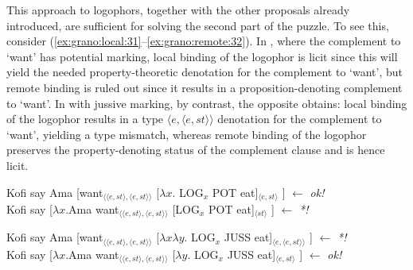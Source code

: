 \documentclass[output=paper,modfonts,nonflat]{langsci/langscibook}
\begin{document}
This approach to logophors, together with the other proposals already introduced, are sufficient for solving the second part of the puzzle. To see this, consider (\ref{ex:grano:local:31}--\ref{ex:grano:remote:32}). In , where the complement to `want' has potential marking, local binding of the logophor is licit since this will yield the needed property-theoretic denotation for the complement to `want', but remote binding is ruled out since it results in a proposition-denoting complement to `want'. In  with jussive marking, by contrast, the opposite obtains: local binding of the logophor results in a type $\langle e,\langle e,st\rangle\rangle$ denotation for the complement to `want', yielding a type mismatch, whereas remote binding of the logophor preserves the property-denoting status of the complement clause and is hence licit. 


\ea  \label{ex:grano:local:31}
    \begin{xlist}
    \ex Kofi  say Ama [want$_{\langle\langle e,st\rangle,\langle e,st\rangle\rangle}$ [$\lambda x$. LOG$_{x}$ POT eat]$_{\langle e,st\rangle}$ ] \hfill $\leftarrow$ \emph{ok!}\\
    \ex Kofi  say [$\lambda x$.Ama want$_{\langle\langle e,st\rangle,\langle e,st\rangle\rangle}$ [LOG$_{x}$ POT eat]$_{\langle st\rangle}$ ] \hfill $\leftarrow$ \emph{*!} 
    \end{xlist}
\z

\ea  \label{ex:grano:remote:32}
    \begin{xlist}
    \ex Kofi  say Ama [want$_{\langle\langle e,st\rangle,\langle e,st\rangle\rangle}$ [$\lambda x\lambda y$. LOG$_{x}$ JUSS eat]$_{\langle e,\langle e,st\rangle\rangle}$ ] \hfill $\leftarrow$ \emph{*!}\\
    \ex Kofi  say [$\lambda x$.Ama want$_{\langle\langle e,st\rangle,\langle e,st\rangle\rangle}$ [$\lambda y$. LOG$_{x}$ JUSS eat]$_{\langle e,st\rangle}$ ] \hfill $\leftarrow$ \emph{ok!} 
    \end{xlist}
\z
\end{document}

